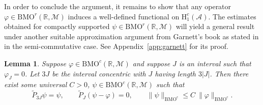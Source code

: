 \documentclass[psamsfonts]{amsart}
\newtheorem{lemma}[theorem]{Lemma}
\newcommand{\Honec}{\mathrm{H}_1^c}
\newcommand{\BMOc}{\mathrm{BMO}^c}
\newcommand{\BMOr}{\mathrm{BMO}^r}
\newcommand{\Hardyc}{\Honec(\mathcal{A})}
\begin{document}
     In order to conclude the argument, it remains to show that any
     operator $\varphi \in \BMOr(\mathbb{R},\mathcal{M})$ induces a
     well-defined functional on $\Hardyc$. The estimates obtained for
     compactly supported $\psi \in \BMOr(\mathbb{R},\mathcal{M})$ will
     yield a general result under another suitable approximation
     argument from Garnett's book \cite[p. 261]{G07} as stated in \cite[Lemma 1.5]{M07}
     in the semi-commutative case. See Appendix~\ref{app:garnett} for its proof.

    \begin{lemma}\label{lem:garnett}
        Suppose $\varphi \in \BMOc(\mathbb{R},\mathcal{M})$ and suppose $J$ is an interval such that $\varphi_J = 0$. Let $3J$ be the interval concentric with $J$ having length $3|J|$. Then there exist some universal $C>0$, $\psi \in \BMOc(\mathbb{R},\mathcal{M})$ such that 
       $$\widetilde{P}_{3J} \psi = \psi,\qquad \widetilde{P}_J (\psi - \varphi) = 0, \qquad \|\psi\|_{\BMOc} \leq C \ \|\varphi\|_{\BMOc}.$$
                \end{lemma}    
    
\end{document}
